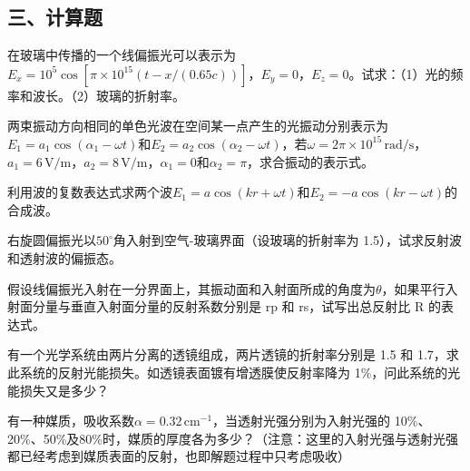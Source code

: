 \documentclass[standard, analysis, notocnum]{ExBook}
\newcommand{\answerarea}[1][8cm]{%
  \par\vspace{2mm}%
  \noindent{\color{themeColor!35}\rule{\linewidth}{0.4pt}}\par
  \noindent\begin{minipage}[t][#1][t]{\linewidth}\vspace{0pt}\end{minipage}\par
  \noindent{\color{themeColor!35}\rule{\linewidth}{0.4pt}}\par
}
\begin{document}
\subsection{三、计算题}
\begin{qitems}[startnum=1]
\qitem 在玻璃中传播的一个线偏振光可以表示为$E_{x}=10^{5}\cos [\pi \times 10^{15}(t-x/(0.65c))]$，$E_{y}=0$，$E_{z}=0$。试求：（1）光的频率和波长。（2）玻璃的折射率。
\label{q:167:start}
\answerarea[8cm]
\label{q:167:end}
\end{qitems}

\begin{qitems}[startnum=2]
\qitem 两束振动方向相同的单色光波在空间某一点产生的光振动分别表示为$E_{1}=a_{1}\cos (\alpha_{1}-\omega t)$和$E_{2}=a_{2}\cos (\alpha_{2}-\omega t)$，若$\omega =2\pi \times 10^{15}\,\mathrm{rad/s}$，$a_{1}=6\,\mathrm{V/m}$，$a_{2}=8\,\mathrm{V/m}$，$\alpha_{1}=0$和$\alpha_{2}=\pi$，求合振动的表示式。
\label{q:168:start}
\answerarea[8cm]
\label{q:168:end}
\end{qitems}

\begin{qitems}[startnum=3]
\qitem 利用波的复数表达式求两个波$E_{1}=a\cos (kr+\omega t)$和$E_{2}=-a\cos (kr-\omega t)$的合成波。
\label{q:169:start}
\answerarea[8cm]
\label{q:169:end}
\end{qitems}

\begin{qitems}[startnum=4]
\qitem 右旋圆偏振光以$50^{\circ}$角入射到空气-玻璃界面（设玻璃的折射率为 1.5），试求反射波和透射波的偏振态。
\label{q:170:start}
\answerarea[8cm]
\label{q:170:end}
\end{qitems}

\begin{qitems}[startnum=5]
\qitem 假设线偏振光入射在一分界面上，其振动面和入射面所成的角度为$\theta$，如果平行入射面分量与垂直入射面分量的反射系数分别是 rp 和 rs，试写出总反射比 R 的表达式。
\label{q:171:start}
\answerarea[8cm]
\label{q:171:end}
\end{qitems}

\begin{qitems}[startnum=6]
\qitem 有一个光学系统由两片分离的透镜组成，两片透镜的折射率分别是 1.5 和 1.7，求此系统的反射光能损失。如透镜表面镀有增透膜使反射率降为 1\%，问此系统的光能损失又是多少？
\label{q:172:start}
\answerarea[8cm]
\label{q:172:end}
\end{qitems}

\begin{qitems}[startnum=7]
\qitem 有一种媒质，吸收系数$\alpha =0.32\,\mathrm{cm}^{-1}$，当透射光强分别为入射光强的 10\%、20\%、50\%及80\%时，媒质的厚度各为多少？（注意：这里的入射光强与透射光强都已经考虑到媒质表面的反射，也即解题过程中只考虑吸收）
\label{q:173:start}
\answerarea[8cm]
\label{q:173:end}
\end{qitems}
\end{document}
